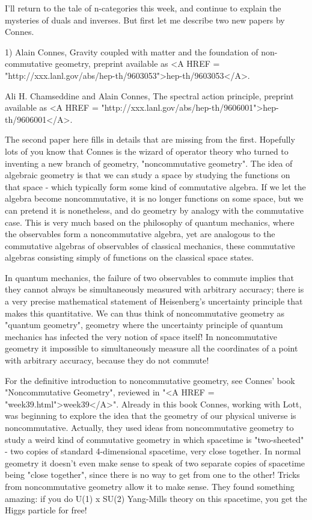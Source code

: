 



I'll return to the tale of n-categories this week, and continue to explain
the mysteries of duals and inverses.  But first let me describe two new
papers by Connes. 

1) Alain Connes, Gravity coupled with matter and the foundation of
non-commutative geometry, preprint available as <A HREF = "http://xxx.lanl.gov/abs/hep-th/9603053">hep-th/9603053</A>.

Ali H. Chamseddine and Alain Connes, The spectral action principle, 
preprint available as <A HREF = "http://xxx.lanl.gov/abs/hep-th/9606001">hep-th/9606001</A>.

The second paper here fills in details that are missing from the first.
Hopefully lots of you know that Connes is the wizard of operator theory
who turned to inventing a new branch of geometry, "noncommutative
geometry".  The idea of algebraic geometry is that we can study
a space by studying the functions on that space - which typically form
some kind of commutative algebra.  If we let the algebra become
noncommutative, it is no longer functions on some space, but we can pretend
it is nonetheless, and do geometry by analogy with the commutative case.
This is very much based on the philosophy of quantum mechanics, where
the observables form a noncommutative algebra, yet are analogous to the
commutative algebras of observables of classical mechanics, these
commutative algebras consisting simply of functions on the classical space
states.   

In quantum mechanics, the failure of two observables to commute implies
that they cannot always be simultaneously measured with arbitrary
accuracy; there is a very precise mathematical statement of Heisenberg's
uncertainty principle that makes this quantitative.  We can thus think
of noncommutative geometry as "quantum geometry", geometry where the
uncertainty principle of quantum mechanics has infected the very notion
of space itself!  In noncommutative geometry it impossible to
simultaneously measure all the coordinates of a point with arbitrary
accuracy, because they do not commute!

For the definitive introduction to noncommutative geometry, see Connes'
book "Noncommutative Geometry", reviewed in "<A HREF = "week39.html">week39</A>".  Already in this
book Connes, working with Lott, was beginning to explore the idea that
the geometry of our physical universe is noncommutative.  Actually, they
used ideas from noncommutative geometry to study a weird kind of
commutative geometry in which spacetime is "two-sheeted" - two copies
of standard 4-dimensional spacetime, very close together.  In normal
geometry it doesn't even make sense to speak of two separate copies of
spacetime being "close together", since there is no way to get from one
to the other!  Tricks from noncommutative geometry allow it to make
sense.  They found something amazing: if you do U(1) x SU(2) Yang-Mills
theory on this spacetime, you get the Higgs particle for free!  

